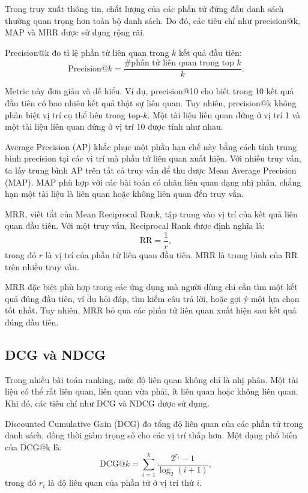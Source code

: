 Trong truy xuất thông tin, chất lượng của các phần tử đứng đầu danh sách thường quan trọng hơn toàn bộ danh sách. Do đó, các tiêu chí như precision@k, MAP và MRR được sử dụng rộng rãi.

Precision@k đo tỉ lệ phần tử liên quan trong \(k\) kết quả đầu tiên:
\begin{equation}
    \text{Precision@}k
    =
    \frac{
        \#\text{phần tử liên quan trong top }k
    }{k}.
    \label{eq:discussion-precision-at-k}
\end{equation}

Metric này đơn giản và dễ hiểu. Ví dụ, precision@10 cho biết trong 10 kết quả đầu tiên có bao nhiêu kết quả thật sự liên quan. Tuy nhiên, precision@k không phân biệt vị trí cụ thể bên trong top-\(k\). Một tài liệu liên quan đứng ở vị trí 1 và một tài liệu liên quan đứng ở vị trí 10 được tính như nhau.

Average Precision (AP) khắc phục một phần hạn chế này bằng cách tính trung bình precision tại các vị trí mà phần tử liên quan xuất hiện. Với nhiều truy vấn, ta lấy trung bình AP trên tất cả truy vấn để thu được Mean Average Precision (MAP). MAP phù hợp với các bài toán có nhãn liên quan dạng nhị phân, chẳng hạn một tài liệu là liên quan hoặc không liên quan đến truy vấn.

MRR, viết tắt của Mean Reciprocal Rank, tập trung vào vị trí của kết quả liên quan đầu tiên. Với một truy vấn, Reciprocal Rank được định nghĩa là:
\begin{equation}
    \text{RR}
    =
    \frac{1}{r},
    \label{eq:discussion-reciprocal-rank}
\end{equation}
trong đó \(r\) là vị trí của phần tử liên quan đầu tiên. MRR là trung bình của RR trên nhiều truy vấn.

MRR đặc biệt phù hợp trong các ứng dụng mà người dùng chỉ cần tìm một kết quả đúng đầu tiên, ví dụ hỏi đáp, tìm kiếm câu trả lời, hoặc gợi ý một lựa chọn tốt nhất. Tuy nhiên, MRR bỏ qua các phần tử liên quan xuất hiện sau kết quả đúng đầu tiên.

\subsection{DCG và NDCG}

Trong nhiều bài toán ranking, mức độ liên quan không chỉ là nhị phân. Một tài liệu có thể rất liên quan, liên quan vừa phải, ít liên quan hoặc không liên quan. Khi đó, các tiêu chí như DCG và NDCG được sử dụng.

Discounted Cumulative Gain (DCG) đo tổng độ liên quan của các phần tử trong danh sách, đồng thời giảm trọng số cho các vị trí thấp hơn. Một dạng phổ biến của DCG@k là:
\begin{equation}
    \text{DCG@}k
    =
    \sum_{i=1}^{k}
    \frac{2^{r_i}-1}{\log_2(i+1)},
    \label{eq:discussion-dcg-at-k}
\end{equation}
trong đó \(r_i\) là độ liên quan của phần tử ở vị trí thứ \(i\).

